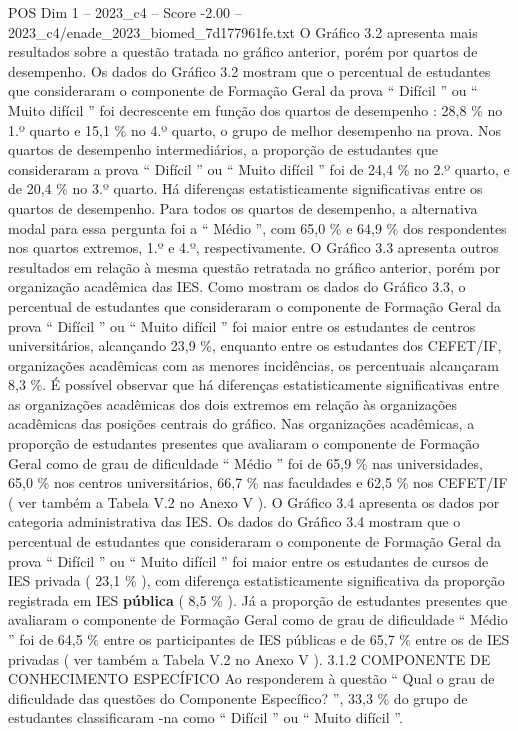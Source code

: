\begin{textsample}{POS Dim 1 – 2023\_c4 – Score -2.00 – 2023\_c4/enade\_2023\_biomed\_7d177961fe.txt}
O Gráfico 3.2 apresenta mais resultados sobre a questão tratada no gráfico anterior, porém por quartos de desempenho.
Os dados do Gráfico 3.2 mostram que o percentual de estudantes que consideraram o componente de Formação Geral da prova “ Difícil ” ou “ Muito difícil ” foi decrescente em função dos quartos de desempenho : 28,8 \% no 1.º quarto e 15,1 \% no 4.º quarto, o grupo de melhor desempenho na prova.
Nos quartos de desempenho intermediários, a proporção de estudantes que consideraram a prova “ Difícil ” ou “ Muito difícil ” foi de 24,4 \% no 2.º quarto, e de 20,4 \% no 3.º quarto.
Há diferenças estatisticamente significativas entre os quartos de desempenho.
Para todos os quartos de desempenho, a alternativa modal para essa pergunta foi a “ Médio ”, com 65,0 \% e 64,9 \% dos respondentes nos quartos extremos, 1.º e 4.º, respectivamente.
O Gráfico 3.3 apresenta outros resultados em relação à mesma questão retratada no gráfico anterior, porém por organização acadêmica das IES.
Como mostram os dados do Gráfico 3.3, o percentual de estudantes que consideraram o componente de Formação Geral da prova “ Difícil ” ou “ Muito difícil ” foi maior entre os estudantes de centros universitários, alcançando 23,9 \%, enquanto entre os estudantes dos CEFET/IF, organizações acadêmicas com as menores incidências, os percentuais alcançaram 8,3 \%.
É possível observar que há diferenças estatisticamente significativas entre as organizações acadêmicas dos dois extremos em relação às organizações acadêmicas das posições centrais do gráfico.
Nas organizações acadêmicas, a proporção de estudantes presentes que avaliaram o componente de Formação Geral como de grau de dificuldade “ Médio ” foi de 65,9 \% nas universidades, 65,0 \% nos centros universitários, 66,7 \% nas faculdades e 62,5 \% nos CEFET/IF ( ver também a Tabela V.2 no Anexo V ).
O Gráfico 3.4 apresenta os dados por categoria administrativa das IES.
Os dados do Gráfico 3.4 mostram que o percentual de estudantes que consideraram o componente de Formação Geral da prova “ Difícil ” ou “ Muito difícil ” foi maior entre os estudantes de cursos de IES privada ( 23,1 \% ), com diferença estatisticamente significativa da proporção registrada em IES \textbf{pública} ( 8,5 \% ).
Já a proporção de estudantes presentes que avaliaram o componente de Formação Geral como de grau de dificuldade “ Médio ” foi de 64,5 \% entre os participantes de IES públicas e de 65,7 \% entre os de IES privadas ( ver também a Tabela V.2 no Anexo V ). 3.1.2 COMPONENTE DE CONHECIMENTO ESPECÍFICO Ao responderem à questão “ Qual o grau de dificuldade das questões do Componente Específico? ”, 33,3 \% do grupo de estudantes classificaram -na como “ Difícil ” ou “ Muito difícil ”.

\end{textsample}
